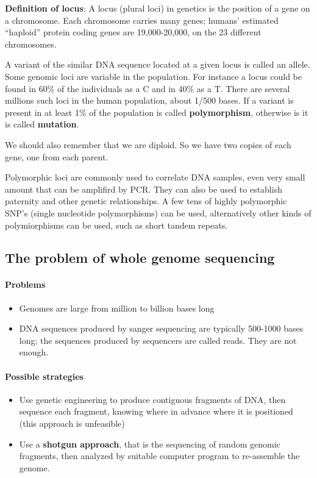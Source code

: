 \textbf{Definition of locus}: A locus (plural loci) in genetics is the position
of a gene on a chromosome.
Each chromosome carries many genes; humans' estimated ``haploid'' protein
coding genes are 19,000-20,000, on the 23 different chromosomes.

A variant of the similar DNA sequence located at a given locus is called
an allele. \\

Some genomic loci are variable in the population.
For instance a locus could be found in 60\% of the individuals as a C and
in 40\% as a T.
There are several millions such loci in the human population, about 1/500
bases.
If a variant is present in at least 1\% of the population is called
\textbf{polymorphism}, otherwise is it is called \textbf{mutation}. 

We should also remember that we are diploid.
So we have two copies of each gene, one from each parent.

Polymorphic loci are commonly used to correlate DNA samples,
even very small amount that can be amplifird by PCR.
They can also be used to establish paternity and other genetic
relationships.
A few tens of highly polymorphic SNP's (single nucleotide polymorphisms)
can be used, alternatively other kinds of polymiorphisms can be used,
such as short tandem repeats.

\subsection{The problem of whole genome sequencing}

\paragraph*{Problems}
\begin{itemize}
	\item Genomes are large from million to billion bases long
	\item DNA sequences produced by sanger sequencing are typically 500-1000
bases long; the sequences produced by sequencers are called reads.
They are not enough.
\end{itemize}

\paragraph*{Possible strategies}
\begin{itemize}
	\item Use genetic engineering to produce contiguous fragments of DNA,
then sequence each fragment, knowing where in advance where it is positioned
(this approach is unfeasible)
	\item Use a \textbf{shotgun approach}, that is the sequencing of random
genomic fragments, then analyzed by suitable computer program to re-assemble
the genome.
\end{itemize}

